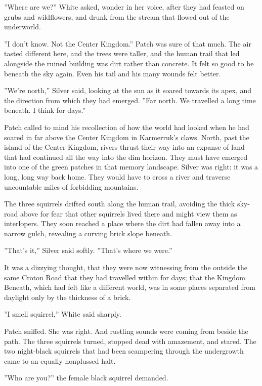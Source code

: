 \documentclass[12pt]{book}
\begin{document}
 ''Where are we?'' White asked, wonder in her voice, after they had feasted on grubs and wildflowers, and drunk from the stream that flowed out of the underworld.\par
 ''I don't know. Not the Center Kingdom.'' Patch was sure of that much. The air tasted different here, and the trees were taller, and the human trail that led alongside the ruined building was dirt rather than concrete. It felt so good to be beneath the sky again. Even his tail and his many wounds felt better.\par
 ''We're north,'' Silver said, looking at the sun as it soared towards its apex, and the direction from which they had emerged. ''Far north. We travelled a long time beneath. I think for days.''\par
 Patch called to mind his recollection of how the world had looked when he had soared in far above the Center Kingdom in Karmerruk's claws. North, past the island of the Center Kingdom, rivers thrust their way into an expanse of land that had continued all the way into the dim horizon. They must have emerged into one of the green patches in that memory landscape. Silver was right: it was a long, long way back home. They would have to cross a river and traverse uncountable miles of forbidding mountains.\par
 The three squirrels drifted south along the human trail, avoiding the thick sky-road above for fear that other squirrels lived there and might view them as interlopers. They soon reached a place where the dirt had fallen away into a narrow gulch, revealing a curving brick slope beneath.\par
 ''That's it,'' Silver said softly. ''That's where we were.''\par
 It was a dizzying thought, that they were now witnessing from the outside the same Croton Road that they had travelled within for days; that the Kingdom Beneath, which had felt like a different world, was in some places separated from daylight only by the thickness of a brick.\par
 ''I smell squirrel,'' White said sharply.\par
 Patch sniffed. She was right. And rustling sounds were coming from beside the path. The three squirrels turned, stopped dead with amazement, and stared. The two night-black squirrels that had been scampering through the undergrowth came to an equally nonplussed halt.\par
 ''Who are you?'' the female black squirrel demanded.\par
\end{document}
